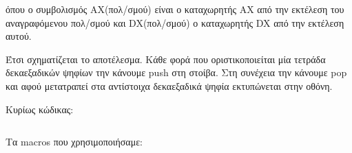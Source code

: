 \documentclass[a4paper,10pt]{article} \usepackage{anysize}
\begin{document}
\noindent όπου ο συμβολισμός ΑΧ(πολ/σμού) είναι ο καταχωρητής AX από την εκτέλεση του
αναγραφόμενου πολ/σμού 
και DX(πολ/σμού) ο καταχωρητής DX από την εκτέλεση αυτού.

Έτσι σχηματίζεται το αποτέλεσμα. Κάθε φορά που οριστικοποιείται μία τετράδα
δεκαεξαδικών ψηφίων την κάνουμε push στη στοίβα. Στη συνέχεια την κάνουμε pop
και αφού μετατραπεί στα αντίστοιχα δεκαεξαδικά ψηφία εκτυπώνεται στην οθόνη.

\noindent Κυρίως κώδικας:
\inputminted[linenos,obeytabs,fontsize=\footnotesize]{nasm}{files/4.asm}
Τα macros που χρησιμοποιήσαμε:
\inputminted[linenos,obeytabs,fontsize=\footnotesize]{nasm}{files/4.txt}
\end{document}
